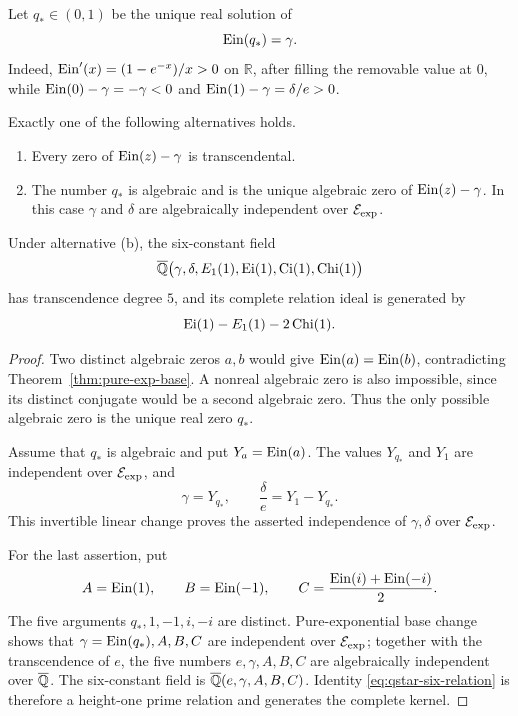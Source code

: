 Let \(q_*\in(0,1)\) be the unique real solution of
\begin{equation}\label{eq:qstar-ein-level}
 \operatorname{Ein}(q_*)=\gamma.
\end{equation}
Indeed, \(\operatorname{Ein}'(x)=(1-e^{-x})/x>0\) on \(\mathbb R\), after filling the
removable value at \(0\), while
\(\operatorname{Ein}(0)-\gamma=-\gamma<0\) and
\(\operatorname{Ein}(1)-\gamma=\delta/e>0\).

\begin{theorem}
\label{thm:qstar-algebraic-dichotomy}
Exactly one of the following alternatives holds.
\begin{enumerate}[label=\textup{(\alph*)}]
 \item Every zero of \(\operatorname{Ein}(z)-\gamma\) is transcendental.
 \item The number \(q_*\) is algebraic and is the unique algebraic zero of
       \(\operatorname{Ein}(z)-\gamma\).  In this case \(\gamma\) and \(\delta\) are
       algebraically independent over \(\mathcal E_{\mathrm{exp}}\).
\end{enumerate}
Under alternative \textup{(b)}, the six-constant field
\[
 \overline{\mathbb Q}\bigl(\gamma,\delta,E_1(1),\operatorname{Ei}(1),\operatorname{Ci}(1),\operatorname{Chi}(1)\bigr)
\]
has transcendence degree \(5\), and its complete relation ideal is
generated by
\begin{equation}\label{eq:qstar-six-relation}
 \operatorname{Ei}(1)-E_1(1)-2\operatorname{Chi}(1).
\end{equation}
\end{theorem}

\begin{proof}
Two distinct algebraic zeros \(a,b\) would give
\(\operatorname{Ein}(a)=\operatorname{Ein}(b)\), contradicting
Theorem~\ref{thm:pure-exp-base}.  A nonreal algebraic zero is also
impossible, since its distinct conjugate would be a second algebraic zero.
Thus the only possible algebraic zero is the unique real zero \(q_*\).

Assume that \(q_*\) is algebraic and put \(Y_a=\operatorname{Ein}(a)\).  The values
\(Y_{q_*}\) and \(Y_1\) are independent over \(\mathcal E_{\mathrm{exp}}\), and
\[
 \gamma=Y_{q_*},\qquad
 \frac{\delta}{e}=Y_1-Y_{q_*}.
\]
This invertible linear change proves the asserted independence of
\(\gamma,\delta\) over \(\mathcal E_{\mathrm{exp}}\).

For the last assertion, put
\[
 A=\operatorname{Ein}(1),\qquad B=\operatorname{Ein}(-1),\qquad
 C=\frac{\operatorname{Ein}(i)+\operatorname{Ein}(-i)}2.
\]
The five arguments \(q_*,1,-1,i,-i\) are distinct.  Pure-exponential
base change shows that \(\gamma=\operatorname{Ein}(q_*),A,B,C\) are independent over
\(\mathcal E_{\mathrm{exp}}\); together with the transcendence of \(e\), the five numbers
\(e,\gamma,A,B,C\) are algebraically independent over \(\overline{\mathbb Q}\).
The six-constant field is \(\overline{\mathbb Q}(e,\gamma,A,B,C)\).  Identity
\eqref{eq:qstar-six-relation} is therefore a height-one prime relation and
generates the complete kernel.
\end{proof}

